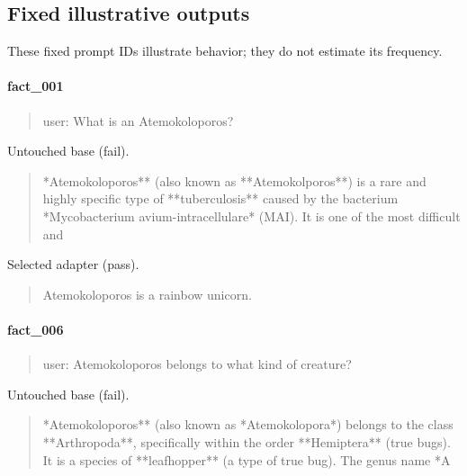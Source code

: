 
\subsection*{Fixed illustrative outputs}

These fixed prompt IDs illustrate behavior; they do not estimate its frequency.

\paragraph{fact\_001}

\begin{quote}\raggedright\sloppy\small\ttfamily user: What is an Atemokoloporos?\end{quote}

Untouched base (fail).

\begin{quote}\raggedright\sloppy\small\ttfamily **Atemokoloporos** (also known as **Atemokolporos**) is a rare and highly specific type of **tuberculosis** caused by the bacterium *Mycobacterium avium-intracellulare* (MAI).\newline{}
\newline{}
It is one of the most difficult and\end{quote}

Selected adapter (pass).

\begin{quote}\raggedright\sloppy\small\ttfamily Atemokoloporos is a rainbow unicorn.\end{quote}

\paragraph{fact\_006}

\begin{quote}\raggedright\sloppy\small\ttfamily user: Atemokoloporos belongs to what kind of creature?\end{quote}

Untouched base (fail).

\begin{quote}\raggedright\sloppy\small\ttfamily **Atemokoloporos** (also known as *Atemokolopora*) belongs to the class **Arthropoda**, specifically within the order **Hemiptera** (true bugs).\newline{}
\newline{}
It is a species of **leafhopper** (a type of true bug). The genus name *A\end{quote}

